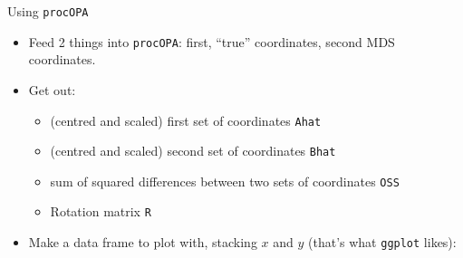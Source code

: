 \begin{frame}[fragile]{Using \texttt{procOPA}}

  \begin{itemize}
  \item Feed 2 things into \texttt{procOPA}: first, ``true''
    coordinates, second MDS coordinates.
  \item Get out: 
    \begin{itemize}
    \item     (centred and scaled) first set of coordinates \texttt{Ahat}
    \item (centred and scaled) second set of coordinates \texttt{Bhat}
    \item sum of squared differences between two sets of coordinates \texttt{OSS}
      \item Rotation matrix \texttt{R}
    \end{itemize}
    
\begin{knitrout}
\color{fgcolor}\begin{kframe}
\begin{alltt}
\hlstd{(}
\hlkwb{=}
\end{alltt}


{\ttfamily\noindent\bfseries\color{errorcolor}{\#\# Error in svd(x): infinite or missing values in 'x'}}\end{kframe}
\end{knitrout}

\item Make a data frame to plot with, stacking $x$ and $y$ (that's
  what \texttt{ggplot} likes):
\begin{knitrout}\small
{}\color{fgcolor}\begin{kframe}
\begin{alltt}
\hlkwb{=}\hlopt{$}
\hlkwb{=}\hlstd{(}\hlstd{=}\hlstd{(Ahat[,}\hlstd{],Bhat[,}\hlstd{]),}
  \hlstd{=}\hlstd{(Ahat[,}\hlstd{],Bhat[,}\hlstd{]),}\hlstd{=}\hlstd{(}\hlstd{(}\hlstd{(}
  \hlstd{=}\hlopt{$}\hlstd{)))}
\end{alltt}



\end{kframe}
\end{knitrout}
\end{itemize}
\end{frame}
